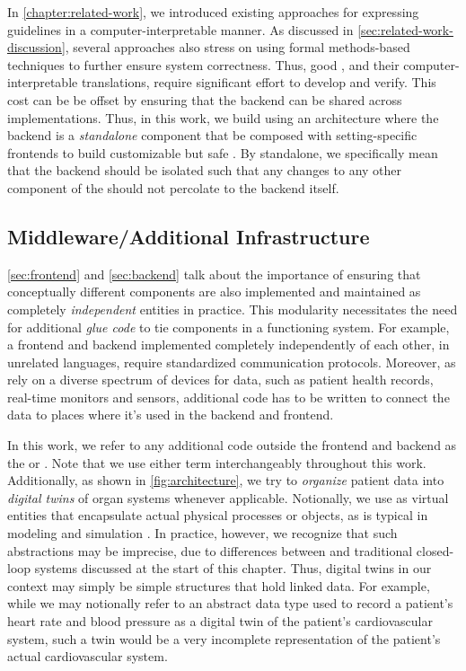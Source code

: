 In \autoref{chapter:related-work}, we introduced existing approaches
for expressing guidelines in a computer-interpretable manner.
As discussed in \autoref{sec:related-work-discussion}, several
approaches also stress on using formal methods-based techniques to further
ensure system correctness. Thus, good \BPGs{}, and
their computer-interpretable translations, require significant
effort to develop and verify. This cost can be
be offset by ensuring that the backend can be shared
across \CDSSs{} implementations. Thus, in this work, we
build \CDSSs{} using an architecture where the backend
is a \emph{standalone} component that be composed with
setting-specific frontends to build customizable but safe \CDSSs{}.
By standalone, we specifically mean that the backend should be isolated
such that any changes to any other  component of the \CDSSs{}
should not percolate to the backend itself.


\subsection{Middleware/Additional Infrastructure}\label{sec:middleware}

\autoref{sec:frontend} and \autoref{sec:backend} talk about
the importance of ensuring that conceptually different components are
also implemented and maintained as completely \emph{independent} entities
in practice. This modularity necessitates the need for additional
\emph{glue code} to tie components in a functioning system. For example,
a frontend and backend implemented completely independently of each
other, in unrelated languages, require standardized communication
protocols. Moreover, as \CDSSs{} rely on a diverse spectrum of devices for
data, such as patient health records, real-time monitors and sensors, additional
code has to be written to connect the data to places where it's used in
the backend and frontend.

In this work, we refer to any additional code outside the frontend and
backend as the  or .
Note that we use either term interchangeably throughout this work.
Additionally, as shown in \autoref{fig:architecture},
we try to \emph{organize} patient
data into \emph{digital twins} of organ systems whenever applicable.
Notionally, we use  as virtual entities that encapsulate
actual physical processes or objects,
as is typical in modeling and simulation \cite{TaoJMS22}.
In practice, however, we recognize that such abstractions may be
imprecise, due to differences between \CDSSs{} and traditional
closed-loop systems discussed at the start of this chapter. Thus,
digital twins in our context may simply be simple structures that
hold linked data. For example, while we may notionally refer to an abstract data type
used to record a patient's heart rate and blood pressure as a digital twin of
the patient's cardiovascular system, such a twin would be a very incomplete
representation of the patient's actual cardiovascular system.

